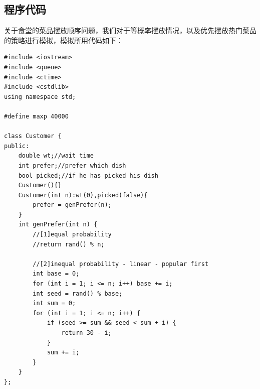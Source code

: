 \documentclass[lang=cn,10pt,a4paper]{elegantpaper}
\begin{document}
\subsection{程序代码}
关于食堂的菜品摆放顺序问题，我们对于等概率摆放情况，以及优先摆放热门菜品的策略进行模拟，模拟所用代码如下：
\lstset{language=C++}
\begin{lstlisting}
#include <iostream>
#include <queue>
#include <ctime>
#include <cstdlib>
using namespace std;

#define maxp 40000

class Customer {
public:
	double wt;//wait time
	int prefer;//prefer which dish
	bool picked;//if he has picked his dish
	Customer(){}
	Customer(int n):wt(0),picked(false){
		prefer = genPrefer(n);
	}
	int genPrefer(int n) {
		//[1]equal probability
		//return rand() % n;

		//[2]inequal probability - linear - popular first
		int base = 0;
		for (int i = 1; i <= n; i++) base += i;
		int seed = rand() % base;
		int sum = 0;
		for (int i = 1; i <= n; i++) {
			if (seed >= sum && seed < sum + i) {
				return 30 - i;
			}
			sum += i;
		}
	}
};


\end{lstlisting}
\end{document}
